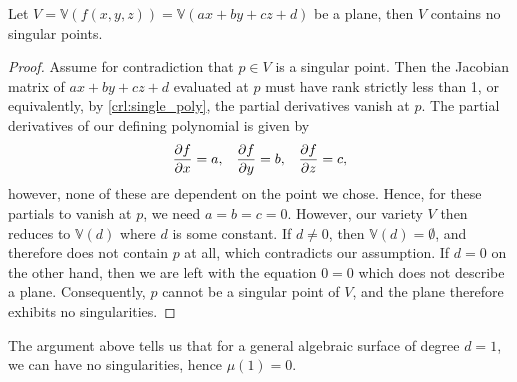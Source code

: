\documentclass{article}
\newcommand{\V}{\ensuremath{\mathbb{V}}}
\begin{document}
    \begin{proposition}
        Let $V = \V(f(x, y, z)) = \V(ax + by + cz + d)$ be a plane, then $V$ contains no
        singular points.
    \end{proposition} 
    \begin{proof}
        Assume for contradiction that $p \in V$ is a singular point. Then the
        Jacobian matrix of $ax + by + cz + d$ evaluated at $p$ must have rank
        strictly less than 1, or equivalently, by \cref{crl:single_poly}, the
        partial derivatives vanish at $p$. The partial derivatives of our
        defining polynomial is given by
        \begin{align*}
            \notag
            \frac{\partial f}{\partial x} = a, && \frac{\partial f}{\partial y} = b, &&  \frac{\partial f}{\partial z} = c,
        \end{align*}
        however, none of these are dependent on the point we chose. Hence, for
        these partials to vanish at $p$, we need $a = b = c = 0$. However, our
        variety $V$ then reduces to $\V(d)$ where $d$ is some constant. If $d
        \neq 0$, then $\V(d) = \emptyset$, and therefore does not contain $p$
        at all, which contradicts our assumption. If $d = 0$ on the other hand,
        then we are left with the equation $0 = 0$ which does not describe a
        plane. Consequently, $p$ cannot be a singular point of $V$, and the
        plane therefore exhibits no singularities. 
    \end{proof}
    The argument above tells us that for a general algebraic surface of degree
    $d = 1$, we can have no singularities, hence $\mu(1) = 0$.
\end{document}
